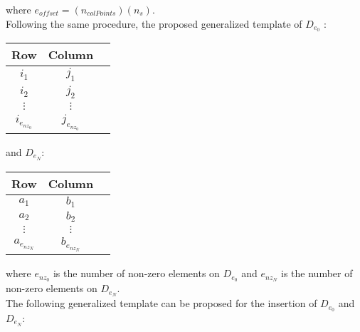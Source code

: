 \documentclass[12pt]{article}
\begin{document}
\noindent where $e_{offset}=(n_{colPoints})(n_s)$.\\
\newpage
\noindent Following the same procedure, the proposed generalized template of $D_{e_0}$ :

\begin{table}[!h]
\begin{center}
\begin{tabular}{c|c|c}
Row             & Column            \\ \hline
$i_1$           & $j_1$         \\
$i_2$           & $j_2$         \\
$\vdots$        & $\vdots$          \\
$i_{e_{nz_0}}$  & $j_{e_{nz_0}}$  \\
\end{tabular}
\end{center}
\end{table}

\noindent and $D_{e_N}$:

\begin{table}[!h]
\begin{center}
\begin{tabular}{c|c|c}
Row             & Column            \\ \hline
$a_1$           & $b_1$         \\
$a_2$           & $b_2$         \\
$\vdots$        & $\vdots$          \\
$a_{e_{nz_N}}$  & $b_{e_{nz_N}}$  \\
\end{tabular}
\end{center}
\end{table}

\noindent where $e_{nz_0}$ is the number of non-zero elements on $D_{e_0}$ and $e_{nz_N}$ is the number of non-zero elements on $D_{e_N}$.\\

\noindent The following generalized template can be proposed for the insertion of $D_{e_0}$ and $D_{e_N}$: 
\end{document}
